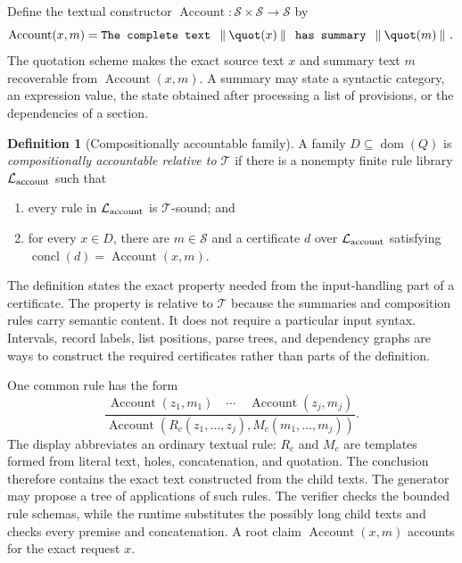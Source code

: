 \documentclass[11pt,twoside]{article}
\theoremstyle{definition}
\newtheorem{definition}[theorem]{Definition}
\newcommand{\Stext}{\mathcal S}
\newcommand{\True}{\mathcal T}
\newcommand{\Lib}{\mathcal L}
\newcommand{\Account}{\operatorname{Account}}
\newcommand{\dom}{\operatorname{dom}}
\newcommand{\cat}{\mathbin{\Vert}}
\begin{document}
Define the textual constructor $\Account:\Stext\times\Stext\to\Stext$ by
\begin{equation}
 \Account(x,m)=
 \text{\ttfamily The complete text }\cat\quot(x)\cat
 \text{\ttfamily\ has summary }\cat\quot(m)\cat\text{\ttfamily .}
 \label{eq:account-text}
\end{equation}
The quotation scheme makes the exact source text $x$ and summary text $m$
recoverable from $\Account(x,m)$. A summary may state a syntactic category, an
expression value, the state obtained after processing a list of provisions,
or the dependencies of a section.

\begin{definition}[Compositionally accountable family]
\label{def:compositionally-accountable}
A family $D\subseteq\dom(Q)$ is \emph{compositionally accountable relative to
$\True$} if there is a nonempty finite rule library $\Lib_{\rm account}$ such that
\begin{enumerate}[label=(\roman*),leftmargin=*]
\item every rule in $\Lib_{\rm account}$ is $\True$-sound; and
\item for every $x\in D$, there are $m\in\Stext$ and a certificate $d$ over
$\Lib_{\rm account}$ satisfying
$\operatorname{concl}(d)=\Account(x,m)$.
\end{enumerate}
\end{definition}

The definition states the exact property needed from the input-handling part
of a certificate. The property is relative to $\True$ because the
summaries and composition rules carry semantic content. It does not require a
particular input syntax. Intervals, record labels, list positions, parse trees,
and dependency graphs are ways to construct the required certificates rather
than parts of the definition.

One common rule has the form
\begin{equation}
 \frac{\Account(z_1,m_1)\quad\cdots\quad
       \Account(z_j,m_j)}
 {\Account(R_c(z_1,\ldots,z_j),
                   M_c(m_1,\ldots,m_j))}.
 \label{eq:account-compose}
\end{equation}
The display abbreviates an ordinary textual rule: $R_c$ and $M_c$ are
templates formed from literal text, holes, concatenation, and quotation. The
conclusion therefore contains the exact text constructed from the child
texts. The generator may propose a tree of applications of such rules. The
verifier checks the bounded rule schemas, while the runtime substitutes the
possibly long child texts and checks every premise and concatenation. A root
claim $\Account(x,m)$ accounts for the exact request $x$.
\end{document}
